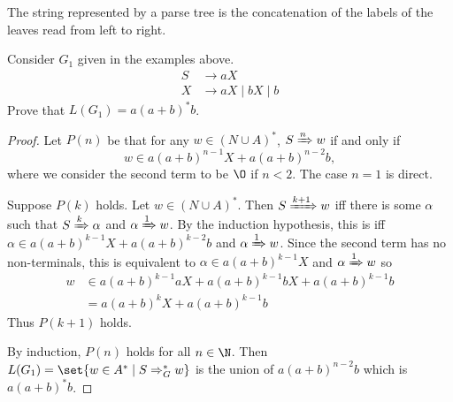 The string represented by a parse tree is the concatenation of the
labels of the leaves read from left to right.

\begin{exercise}
    Consider $G_1$ given in the examples above. \begin{align*}
        S &\to aX \\
        X &\to aX \mid bX \mid b
    \end{align*}
    Prove that $L(G_1) = a(a + b)^*b$.
\end{exercise}
\begin{proof}
    Let $P(n)$ be that for any $w \in (N \cup A)^*$, $S \xRightarrow{n} w$
    if and only if \[
        w \in a(a + b)^{n-1}X + a(a + b)^{n-2}b,
    \] where we consider the second term to be $\O$ if $n < 2$.
    The case $n = 1$ is direct.

    Suppose $P(k)$ holds.
    Let $w \in (N \cup A)^*$.
    Then $S \xRightarrow{k+1} w$ iff there is some $\alpha$ such that
    $S \xRightarrow{k} \alpha$ and $\alpha \xRightarrow{1} w$.
    By the induction hypothesis, this is iff $\alpha \in a(a+b)^{k-1}X
    + a(a+b)^{k-2}b$ and $\alpha \xRightarrow{1} w$.
    Since the second term has no non-terminals, this is equivalent to
    $\alpha \in a(a+b)^{k-1}X$ and $\alpha \xRightarrow{1} w$ so
    \begin{align*}
        w &\in a(a+b)^{k-1}aX + a(a+b)^{k-1}bX + a(a+b)^{k-1}b \\
        &= a(a+b)^k X + a(a+b)^{k-1}b
    \end{align*}
    Thus $P(k+1)$ holds.

    By induction, $P(n)$ holds for all $n \in \N$.
    Then $L(G_1) = \set{w \in A^* \mid S \Rightarrow^*_G w}$ is the union
    of $a(a+b)^{n-2}b$ which is $a(a+b)^*b$.
\end{proof}
